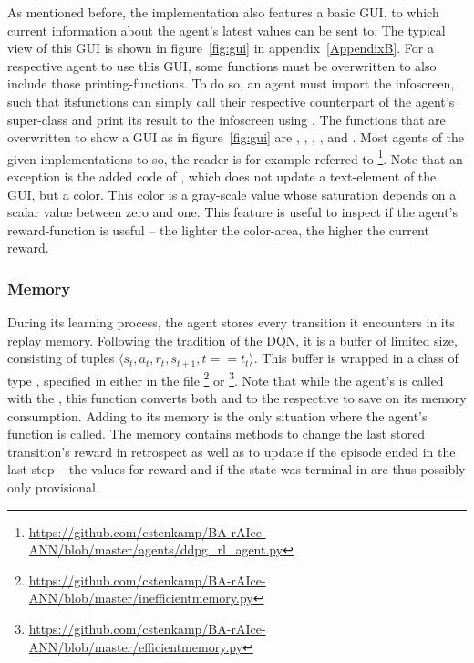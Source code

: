 As mentioned before, the implementation also features a basic GUI, to which current information about the agent's latest values can be sent to. The typical view of this GUI is shown in figure~\ref{fig:gui} in appendix~\ref{AppendixB}. For a respective agent to use this GUI, some functions must be overwritten to also include those printing-functions. To do so, an agent must import the infoscreen, such that itsfunctions can simply call their respective counterpart of the agent's super-class and print its result to the infoscreen using . The functions that are overwritten to show a GUI as in figure~\ref{fig:gui} are , , , ,  and . Most agents of the given implementations to so, the reader is for example referred to \footnote{\url{https://github.com/cstenkamp/BA-rAIce-ANN/blob/master/agents/ddpg_rl_agent.py}}. Note that an exception is the added code of , which does not update a text-element of the GUI, but a color. This color is a gray-scale value whose saturation depends on a scalar value between zero and one. This feature is useful to inspect if the agent's reward-function is useful -- the lighter the color-area, the higher the current reward.

\subsubsection{Memory}

During its learning process, the agent stores every transition it encounters in its replay memory. Following the tradition of the DQN\cite{mnih_human-level_2015}, it is a buffer of limited size, consisting of tuples $\langle s_t, a_t, r_t, s_{t+1}, t==t_t \rangle$. This buffer is wrapped in a class of type , specified in either in the file \footnote{\url{https://github.com/cstenkamp/BA-rAIce-ANN/blob/master/inefficientmemory.py}} or \footnote{\url{https://github.com/cstenkamp/BA-rAIce-ANN/blob/master/efficientmemory.py}}. Note that while the agent's  is called with the , this function converts both  and  to the respective  to save on its memory consumption. Adding to its memory is the only situation where the agent's function  is called. The memory contains methods to change the last stored transition's reward in retrospect as well as to update if the episode ended in the last step -- the values for reward and if the state was terminal in  are thus possibly only provisional.

